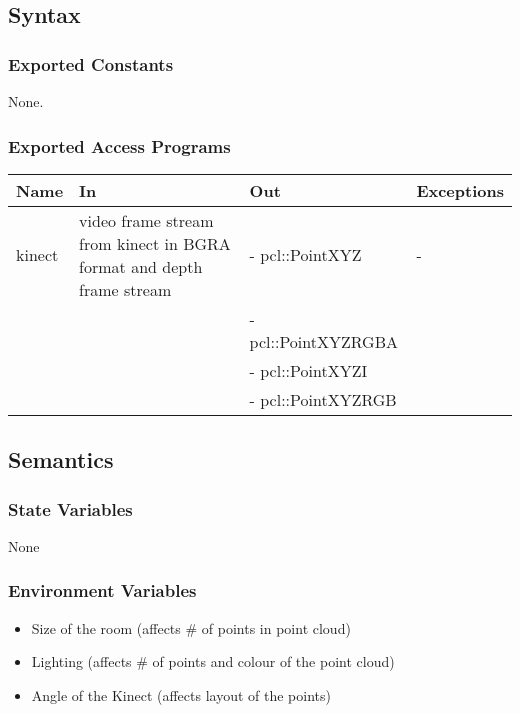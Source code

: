 \documentclass[12pt, titlepage]{article}
\begin{document}
\subsection{Syntax}

\subsubsection{Exported Constants}

None.

\subsubsection{Exported Access Programs}

\begin{center}
\begin{tabular}{p{2cm} p{4cm} p{5cm} p{2cm}}
\hline
\textbf{Name} & \textbf{In} & \textbf{Out} & \textbf{Exceptions} \\
\hline
kinect & video frame stream from kinect in BGRA format and depth frame stream
& - pcl::PointXYZ & - \\
 & & - pcl::PointXYZRGBA &  \\
 & & - pcl::PointXYZI &  \\
 & & - pcl::PointXYZRGB &  \\
\hline
\end{tabular}
\end{center}

\subsection{Semantics}

\subsubsection{State Variables}

None

\subsubsection{Environment Variables}

\begin{itemize}
  \item Size of the room (affects \# of points in point cloud)
  \item Lighting (affects \# of points and colour of the point cloud)
  \item Angle of the Kinect (affects layout of the points)
\end{itemize}
\end{document}
